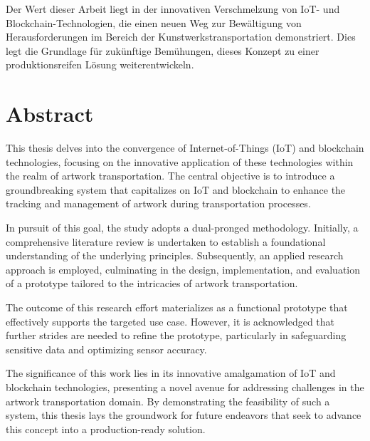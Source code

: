 Der Wert dieser Arbeit liegt in der innovativen Verschmelzung von IoT- und Blockchain-Technologien, die einen neuen Weg zur Bewältigung von Herausforderungen im Bereich der Kunstwerkstransportation demonstriert. Dies legt die Grundlage für zukünftige Bemühungen, dieses Konzept zu einer produktionsreifen Lösung weiterentwickeln.


\chapter*{Abstract}
This thesis delves into the convergence of Internet-of-Things (IoT) and blockchain technologies, focusing on the innovative application of these technologies within the realm of artwork transportation. The central objective is to introduce a groundbreaking system that capitalizes on IoT and blockchain to enhance the tracking and management of artwork during transportation processes.

In pursuit of this goal, the study adopts a dual-pronged methodology. Initially, a comprehensive literature review is undertaken to establish a foundational understanding of the underlying principles. Subsequently, an applied research approach is employed, culminating in the design, implementation, and evaluation of a prototype tailored to the intricacies of artwork transportation.

The outcome of this research effort materializes as a functional prototype that effectively supports the targeted use case. However, it is acknowledged that further strides are needed to refine the prototype, particularly in safeguarding sensitive data and optimizing sensor accuracy.

The significance of this work lies in its innovative amalgamation of IoT and blockchain technologies, presenting a novel avenue for addressing challenges in the artwork transportation domain. By demonstrating the feasibility of such a system, this thesis lays the groundwork for future endeavors that seek to advance this concept into a production-ready solution.

